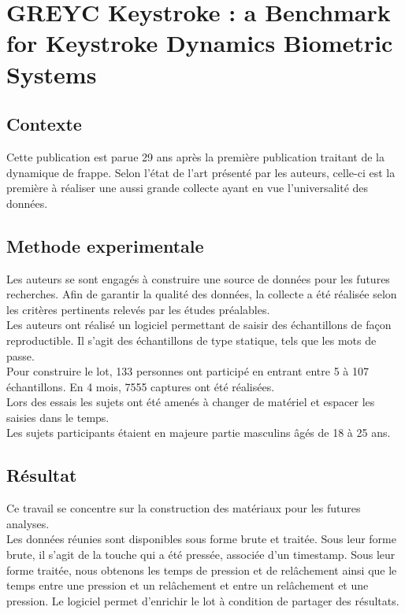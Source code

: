 \section{GREYC Keystroke : a Benchmark for Keystroke Dynamics Biometric Systems\cite{giotGREYC}}

\subsection{Contexte}

Cette publication est parue 29 ans après la première publication traitant de la dynamique de frappe. Selon l'état de l'art présenté par les auteurs, celle-ci est la première à réaliser une aussi grande collecte ayant en vue l'universalité des données.

\subsection{Methode experimentale}

Les auteurs se sont engagés à construire une source de données pour les futures recherches. Afin de garantir la qualité des données, la collecte a été réalisée selon les critères pertinents relevés par les études préalables.\\

Les auteurs ont réalisé un logiciel permettant de saisir des échantillons de façon reproductible. Il s'agit des échantillons de type statique, tels que les mots de passe.\\

Pour construire le lot, 133 personnes ont participé en entrant entre 5 à 107 échantillons. En 4 mois, 7555 captures ont été réalisées.\\

Lors des essais les sujets ont été amenés à changer de matériel et espacer les saisies dans le temps.\\

Les sujets participants étaient en majeure partie masculins âgés de 18 à 25 ans.

\subsection{Résultat}

Ce travail se concentre sur la construction des matériaux pour les futures analyses.\\

Les données réunies sont disponibles sous forme brute et traitée. Sous leur forme brute, il s'agit de la touche qui a été pressée, associée d'un timestamp. Sous leur forme traitée, nous obtenons les temps de pression et de relâchement ainsi que le temps entre une pression et un relâchement et entre un relâchement et une pression. Le logiciel permet d'enrichir le lot à condition de partager des résultats.\\

